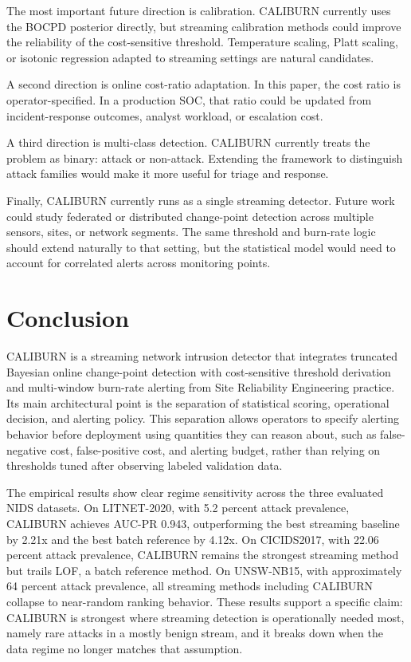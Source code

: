 \documentclass[preprint,12pt,authoryear]{elsarticle}
\newcommand{\caliburn}{CALIBURN}
\begin{document}
The most important future direction is calibration. \caliburn{} currently uses the BOCPD posterior directly, but streaming calibration methods could improve the reliability of the cost-sensitive threshold. Temperature scaling, Platt scaling, or isotonic regression \citep{zadrozny2002transforming} adapted to streaming settings are natural candidates.

A second direction is online cost-ratio adaptation. In this paper, the cost ratio is operator-specified. In a production SOC, that ratio could be updated from incident-response outcomes, analyst workload, or escalation cost.

A third direction is multi-class detection. \caliburn{} currently treats the problem as binary: attack or non-attack. Extending the framework to distinguish attack families would make it more useful for triage and response.

Finally, \caliburn{} currently runs as a single streaming detector. Future work could study federated or distributed change-point detection across multiple sensors, sites, or network segments. The same threshold and burn-rate logic should extend naturally to that setting, but the statistical model would need to account for correlated alerts across monitoring points.

\section{Conclusion}
\label{sec:conclusion}

\caliburn{} is a streaming network intrusion detector that integrates truncated Bayesian online change-point detection with cost-sensitive threshold derivation and multi-window burn-rate alerting from Site Reliability Engineering practice. Its main architectural point is the separation of statistical scoring, operational decision, and alerting policy. This separation allows operators to specify alerting behavior before deployment using quantities they can reason about, such as false-negative cost, false-positive cost, and alerting budget, rather than relying on thresholds tuned after observing labeled validation data.

The empirical results show clear regime sensitivity across the three evaluated NIDS datasets. On LITNET-2020, with 5.2 percent attack prevalence, \caliburn{} achieves AUC-PR 0.943, outperforming the best streaming baseline by 2.21x and the best batch reference by 4.12x. On CICIDS2017, with 22.06 percent attack prevalence, \caliburn{} remains the strongest streaming method but trails LOF, a batch reference method. On UNSW-NB15, with approximately 64 percent attack prevalence, all streaming methods including \caliburn{} collapse to near-random ranking behavior. These results support a specific claim: \caliburn{} is strongest where streaming detection is operationally needed most, namely rare attacks in a mostly benign stream, and it breaks down when the data regime no longer matches that assumption.
\end{document}
